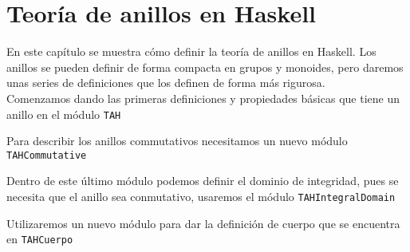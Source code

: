 \chapter{Teoría de anillos en Haskell}\label{sec:anillosHas}

En este capítulo se muestra cómo definir la teoría de anillos en Haskell. Los anillos se pueden definir de forma compacta en grupos y monoides, pero daremos unas series de definiciones que los definen de forma más rigurosa.\\

Comenzamos dando las primeras definiciones y propiedades básicas que tiene un anillo en el módulo \texttt{TAH} 

Para describir los anillos commutativos necesitamos un nuevo módulo \texttt{TAHCommutative}

Dentro de este último módulo podemos definir el dominio de integridad, pues se necesita que el anillo sea conmutativo, usaremos el módulo \texttt{TAHIntegralDomain}

Utilizaremos un nuevo módulo para dar la definición de cuerpo que se encuentra en \texttt{TAHCuerpo}
